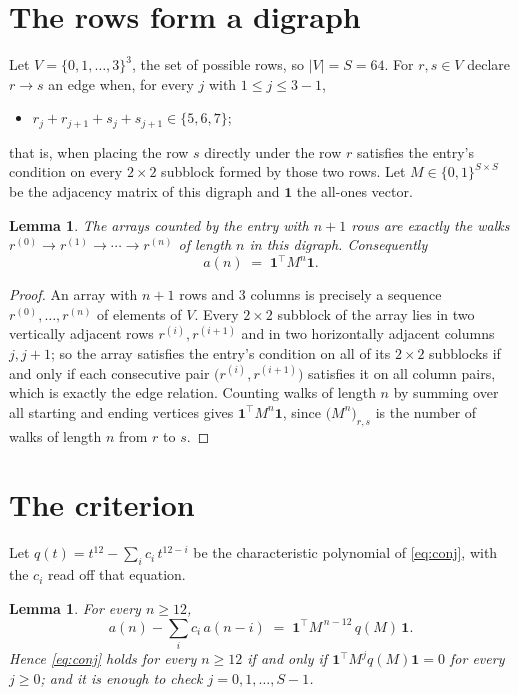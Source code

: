 \documentclass[11pt,a4paper]{article}
\theoremstyle{plain}
\newtheorem{lemma}[theorem]{Lemma}
\theoremstyle{definition}
\begin{document}
\section{The rows form a digraph}

Let $V=\{0,1,\dots,3\}^{3}$, the set of possible rows, so $|V|=S=64$. For
$r,s\in V$ declare $r\to s$ an edge when, for every $j$ with $1\le j\le 3-1$,
\begin{itemize}
\item $r_j+r_{j+1}+s_j+s_{j+1}\in\{5, 6, 7\}$;

\end{itemize}
that is, when placing the row $s$ directly under the row $r$ satisfies the entry's
condition on every $2\times2$ subblock formed by those two rows. Let $M\in\{0,1\}^{S\times
S}$ be the adjacency matrix of this digraph and $\mathbf{1}$ the all-ones vector.

\begin{lemma}\label{lem:walk}
The arrays counted by the entry with $n+1$ rows are exactly the walks
$r^{(0)}\to r^{(1)}\to\cdots\to r^{(n)}$ of length $n$ in this digraph. Consequently
\[
a(n)\;=\;\mathbf{1}^{\!\top}M^{n}\mathbf{1} .
\]
\end{lemma}

\begin{proof}
An array with $n+1$ rows and $3$ columns is precisely a sequence
$r^{(0)},\dots,r^{(n)}$ of elements of $V$. Every $2\times2$ subblock of the array lies
in two vertically adjacent rows $r^{(i)},r^{(i+1)}$ and in two horizontally adjacent
columns $j,j+1$; so the array satisfies the entry's condition on all of its $2\times2$
subblocks if and only if each consecutive pair $\bigl(r^{(i)},r^{(i+1)}\bigr)$ satisfies
it on all column pairs, which is exactly the edge relation. Counting walks of length $n$ by
summing over all starting and ending vertices gives
$\mathbf{1}^{\!\top}M^{n}\mathbf{1}$, since
$\bigl(M^{n}\bigr)_{r,s}$ is the number of walks of length $n$ from $r$ to $s$.
\end{proof}

\section{The criterion}

Let $q(t)=t^{12}-\sum_{i}c_i\,t^{12-i}$ be the characteristic polynomial of
\eqref{eq:conj}, with the $c_i$ read off that equation.

\begin{lemma}\label{lem:crit}
For every $n\ge12$,
\[
a(n)-\sum_i c_i\,a(n-i)\;=\;\mathbf{1}^{\!\top}M^{\,n-12}\,q(M)\,\mathbf{1} .
\]
Hence \eqref{eq:conj} holds for every $n\ge12$ if and only if
$\mathbf{1}^{\!\top}M^{j}q(M)\mathbf{1}=0$ for every $j\ge0$; and it is enough to
check $j=0,1,\dots,S-1$.
\end{lemma}
\end{document}
